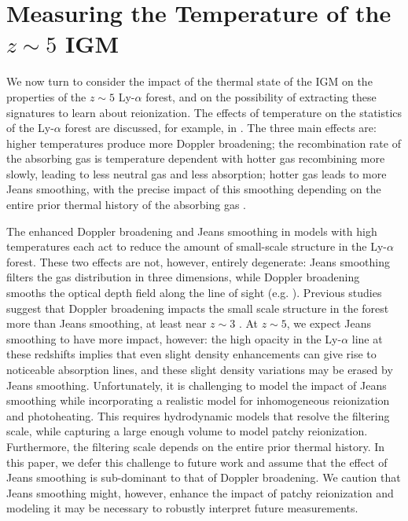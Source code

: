 \section{Measuring the Temperature of the $z \sim 5$ IGM}
\label{sec:temp_measure}

We now turn to consider the impact of the thermal state of the IGM on the properties of the $z \sim 5$ Ly-$\alpha$ 
forest, and
on the possibility of extracting these signatures to learn about reionization. The effects of temperature
on the statistics of the Ly-$\alpha$ forest are discussed, for example, in \citet{Lidz:2009ca}. The three main effects 
are: higher temperatures produce more Doppler broadening; the recombination rate of the absorbing gas is temperature
dependent with hotter gas recombining more slowly, leading to less neutral gas and less absorption; hotter gas leads
to more Jeans smoothing, with the precise impact of this smoothing depending on the entire prior thermal history of the absorbing gas
\citep{Gnedin:1997td}. 

The enhanced Doppler broadening and Jeans smoothing in models with high temperatures each act to reduce the amount of small-scale structure in the Ly-$\alpha$ forest.
These two effects are not, however, entirely degenerate: Jeans smoothing filters the gas distribution in three dimensions, while
Doppler broadening smooths the optical depth field along the line of sight 
(e.g. \citealt{Zaldarriaga:2000mz}). Previous studies suggest that Doppler broadening impacts the small scale structure in the
forest more than Jeans smoothing, at least near $z \sim 3$ \citep{Zaldarriaga:2000mz,Peeples:2009ue,Lidz:2009ca}. At $z \sim 5$, we 
expect Jeans smoothing to have more impact, however: the high opacity in the Ly-$\alpha$ line at these redshifts implies that even slight
density enhancements can give rise to noticeable absorption lines, and these slight density variations may be erased by Jeans
smoothing. Unfortunately, it is challenging to model the impact of Jeans smoothing while incorporating a realistic model
for inhomogeneous reionization and photoheating. This requires hydrodynamic models that resolve the filtering scale, while capturing
a large enough volume to model patchy reionization. Furthermore, the filtering scale depends on the entire prior thermal history. 
In this paper, we defer this challenge to future work and assume that the effect of Jeans smoothing is sub-dominant
to that of Doppler broadening. We caution that Jeans smoothing might, however, enhance the impact of patchy reionization and 
modeling it may be necessary to robustly interpret future measurements. 

